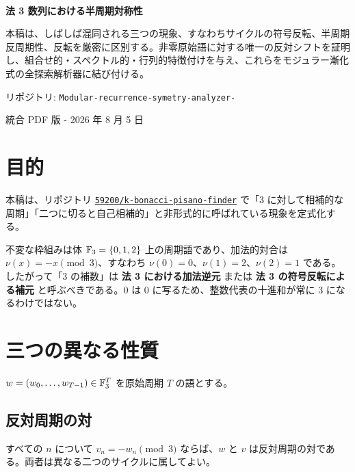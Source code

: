 \documentclass[11pt,a4paper]{article}
\begin{document}
\begin{titlepage}\thispagestyle{empty}\vspace*{22mm}{\color{accent}\rule{\textwidth}{1.2pt}}\\[15mm]{\fontsize{27}{33}\selectfont\bfseries\color{ink}法 3 数列における半周期対称性\par}\vspace{13mm}\begin{summarybox}本稿は、しばしば混同される三つの現象、すなわちサイクルの符号反転、半周期反周期性、反転を厳密に区別する。非零原始語に対する唯一の反対シフトを証明し、組合せ的・スペクトル的・行列的特徴付けを与え、これらをモジュラー漸化式の全探索解析器に結び付ける。\end{summarybox}\vfill{\large\color{muted}リポジトリ: \texttt{Modular-recurrence-symetry-analyzer-}\par}{\large\color{muted}統合 PDF 版 - 2026 年 8 月 5 日\par}\vspace{12mm}{\color{accent}\rule{\textwidth}{1.2pt}}\end{titlepage}
\renewcommand{\contentsname}{目次}\tableofcontents\clearpage
\section{目的}
本稿は、リポジトリ \href{https://github.com/59200/k-bonacci-pisano-finder}{\texttt{59200/k-bonacci-pisano-finder}} で「3 に対して相補的な周期」「二つに切ると自己相補的」と非形式的に呼ばれている現象を定式化する。

不変な枠組みは体 \(\mathbb F_3=\{0,1,2\}\) 上の周期語であり、加法的対合は \(\nu(x)=-x\pmod3\)、すなわち \(\nu(0)=0\)、\(\nu(1)=2\)、\(\nu(2)=1\) である。したがって「3 の補数」は \textbf{法 3 における加法逆元} または \textbf{法 3 の符号反転による補元} と呼ぶべきである。0 は 0 に写るため、整数代表の十進和が常に 3 になるわけではない。
\section{三つの異なる性質}
\(w=(w_0,\ldots,w_{T-1})\in\mathbb F_3^T\) を原始周期 \(T\) の語とする。
\subsection{反対周期の対}
すべての \(n\) について \(v_n=-w_n\pmod3\) ならば、\(w\) と \(v\) は反対周期の対である。両者は異なる二つのサイクルに属してよい。
\end{document}
